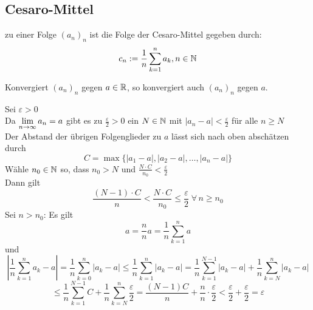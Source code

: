 \documentclass[../ana1u.tex]{subfiles}
\begin{document}
\subsection{Cesaro-Mittel}
zu einer Folge \((a_n)_n\) ist die Folge der Cesaro-Mittel gegeben durch:
\[c_n := \frac{1}{n} \sum_{k=1}^{n} a_k, n\in \mathbb{N}\]
\begin{beh}
    Konvergiert \((a_n)_n\) gegen \(a \in \mathbb{R}\), so konvergiert auch \((a_n)_n\) gegen \(a\).
\end{beh}
\begin{bew}
    Sei \(\varepsilon > 0\)\\
    Da \(\lim\limits_{n\rightarrow\infty} a_n = a\) gibt es zu \(\frac{\varepsilon}{2} > 0\) ein \(N \in \mathbb{N}\) mit \(|a_n -a| < \frac{\varepsilon}{2}\) für alle \(n \geq N\)\\
    Der Abstand der übrigen Folgenglieder zu \(a\) lässt sich nach oben abschätzen durch
    \[C = \max\{|a_1-a|,|a_2-a|, \dots, |a_n-a|\}\]
    Wähle \(n_0 \in \mathbb{N}\) so, dass \(n_0 > N\) und \(\frac{N \cdot C}{n_0} < \frac{\varepsilon}{2}\)\\
    Dann gilt
    \[\frac{(N-1) \cdot C}{n} < \frac{N \cdot C}{n_0} \leq \frac{\varepsilon}{2} \; \forall \, n \geq n_0\]
    Sei \(n > n_0\): Es gilt
    \[a = \frac{n}{n}a = \frac{1}{n} \sum_{k=1}^{n} a\]
    und
    \[\left|\frac{1}{n} \sum_{k=1}^{n} a_k-a\right| = \frac{1}{n} \sum_{k=0}^{n} |a_k-a| \leq \frac{1}{n} \sum_{k=1}^{n} |a_k-a| = \frac{1}{n} \sum_{k=1}^{N-1} |a_k-a| + \frac{1}{n} \sum_{k=N}^{n} |a_k-a|\]
    \[\leq \frac{1}{n} \sum_{k=1}^{N-1} C + \frac{1}{n} \sum_{k=N}^{n} \frac{\varepsilon}{2} = \frac{(N-1)C}{n} + \frac{n}{n} \cdot \frac{\varepsilon}{2} < \frac{\varepsilon}{2} + \frac{\varepsilon}{2} = \varepsilon \]
\end{bew}
\end{document}

